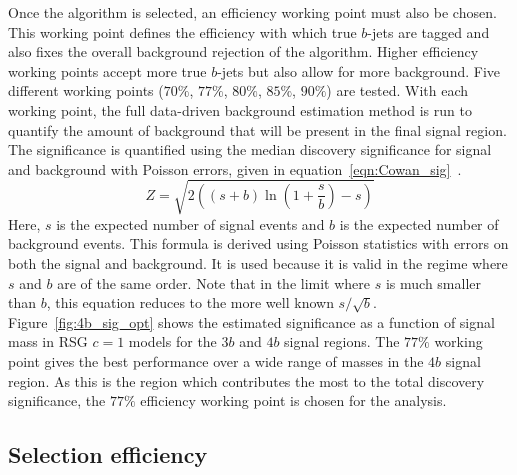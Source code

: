 Once the algorithm is selected, an efficiency working point must also be chosen. This working point defines the efficiency with which true $b$-jets are tagged and also fixes the overall background rejection of the algorithm. Higher efficiency working points accept more true $b$-jets but also allow for more background. Five different working points ($70\%$, $77\%$, $80\%$, $85\%$, $90\%$) are tested. With each working point, the full data-driven background estimation method is run to quantify the amount of background that will be present in the final signal region. The significance is quantified using the median discovery significance for signal and background with Poisson errors, given in equation~\ref{eqn:Cowan_sig}~\cite{CowanSig}. 
%
\begin{equation}
\label{eqn:Cowan_sig}
Z = \sqrt{2\left((s+b)\ln\left(1+\frac{s}{b}\right) - s\right)}
\end{equation}
%
Here, $s$ is the expected number of signal events and $b$ is the expected number of background events. This formula is derived using Poisson statistics with errors on both the signal and background. It is used because it is valid in the regime where $s$ and $b$ are of the same order. Note that in the limit where $s$ is much smaller than $b$, this equation reduces to the more well known $s/\sqrt{b}$. Figure~\ref{fig:4b_sig_opt} shows the estimated significance as a function of signal mass in RSG $c=1$ models for the $3b$ and $4b$ signal regions. The $77\%$ working point gives the best performance over a wide range of masses in the $4b$ signal region. As this is the region which contributes the most to the total discovery significance, the $77\%$ efficiency working point is chosen for the analysis. 

\subsection{Selection efficiency}

